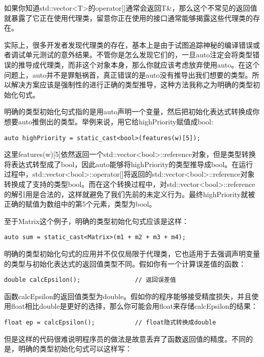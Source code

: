 如果你知道std::vector<T>的operator[]通常会返回T\&，那么这个不常见的返回值就暴露了它正在使用代理类，留意你正在使用的接口通常能够揭露这些代理类的存在。

实际上，很多开发者发现代理类的存在，基本上是由于试图追踪神秘的编译错误或者调试单元测试的意外结果。不管你是怎么发现它们的，一旦auto注定会将类型错误的推导成代理类，而非这个对象本身，那么你就应该考虑放弃使用auto。在这个问题上，auto并不是罪魁祸首，真正错误的是auto没有推导出我们想要的类型。所以解决方案应该是强制性的进行正确的类型推导，这种方法我称之为明确的类型初始化句式。

明确的类型初始化句式指的是用auto声明一个变量，然后把初始化表达式转换成你想要auto推倒出的类型。举例来说，用它给highPriority赋值成bool:

\begin{lstlisting}
auto highPriority = static_cast<bool>(features(w)[5]);
\end{lstlisting}

这里features(w)[5]依然返回一个std::vector<bool>::reference对象，但是类型转换将表达式转型成了bool，因此auto能够将highPriority的类型推导成bool。在运行过程中，std::vector<bool>::operator[]将返回的std::vector<bool>::reference对象转换成了支持的类型bool。而在这个转换过程中，对std::vector<bool>::reference的解引用是合法的，这样就避免了我们先前的未定义行为。最终highPriority就被正确的赋值为数组中的第5个元素，类型为bool。

至于Matrix这个例子，明确的类型初始化句式应该是这样：

\begin{lstlisting}
auto sum = static_cast<Matrix>(m1 + m2 + m3 + m4);
\end{lstlisting}

明确的类型初始化句式的应用并不仅仅局限于代理类，它也适用于去强调声明变量的类型与初始化表达式的返回值类型不同。假如你有一个计算误差值的函数：

\begin{lstlisting}
double calcEpsilon();               // 返回误差值
\end{lstlisting}

函数calcEpsilon的返回值类型为double。假如你的程序能够接受精度损失，并且使用float相比double是更好的选择，那么你可能会用float来存储calcEpsilon的结果：

\begin{lstlisting}
float ep = calcEpsilon();           // float隐式转换成double
\end{lstlisting}

但是这样的代码很难说明程序员的做法是故意丢弃了函数返回值的精度。不同的是，明确的类型初始化句式可以这样写：

